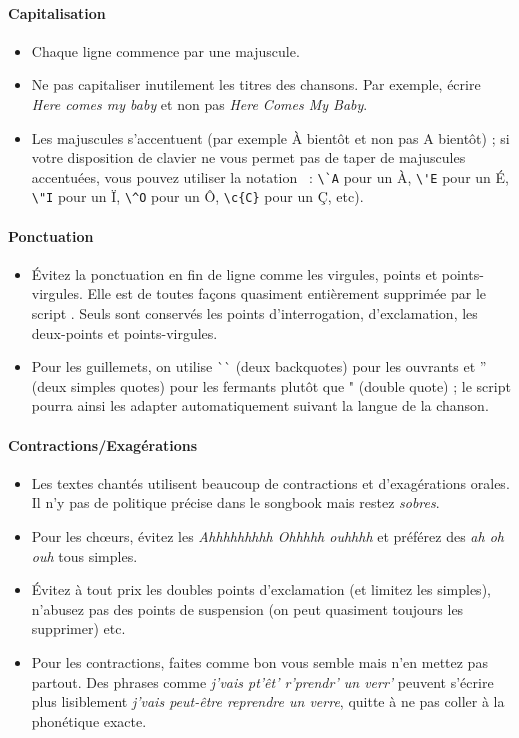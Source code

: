 \paragraph{Capitalisation}
\begin{itemize}
  \item Chaque ligne commence par une majuscule.
  \item Ne pas capitaliser inutilement les titres des chansons. Par
    exemple, écrire \emph{Here comes my baby} et non pas \emph{Here
      Comes My Baby}.
  \item Les majuscules s'accentuent (par exemple {\og}À bientôt{\fg}
    et non pas {\og}A bientôt{\fg}) ; si votre disposition de clavier ne
    vous permet pas de taper de majuscules accentuées, vous pouvez
    utiliser la notation \latex~: \verb|\`A| pour un \`A, \verb|\'E|
    pour un \'E, \verb|\"I| pour un \"I, \verb|\^O| pour un \^O,
    \verb|\c{C}| pour un \c{C}, etc).
\end{itemize}

\paragraph{Ponctuation}
\begin{itemize}
\item Évitez la ponctuation en fin de ligne comme les virgules, points
  et points-virgules. Elle est de toutes façons quasiment entièrement
  supprimée par le script . Seuls sont conservés les
  points d'interrogation, d'exclamation, les deux-points et
  points-virgules.
\item Pour les guillemets, on utilise \`{}\`{} (deux backquotes) pour
  les ouvrants et '' (deux simples quotes) pour les fermants plutôt
  que " (double quote) ; le script  pourra ainsi les
  adapter automatiquement suivant la langue de la chanson.
\end{itemize}

\paragraph{Contractions/Exagérations}
\begin{itemize}
\item Les textes chantés utilisent beaucoup de contractions et
  d'exagérations orales. Il n'y pas de politique précise dans le
  songbook mais restez \emph{sobres}.
\item Pour les chœurs, évitez les \emph{Ahhhhhhhhh Ohhhhh ouhhhh} et
  préférez des \emph{ah oh ouh} tous simples.
\item Évitez à tout prix les doubles points d'exclamation (et limitez
  les simples), n'abusez pas des points de suspension (on peut
  quasiment toujours les supprimer) etc.
\item Pour les contractions, faites comme bon vous semble mais n'en
  mettez pas partout. Des phrases comme \emph{j'vais pt'êt' r'prendr'
    un verr'} peuvent s'écrire plus lisiblement \emph{j'vais peut-être
    reprendre un verre}, quitte à ne pas coller à la phonétique
  exacte.
\end{itemize}

